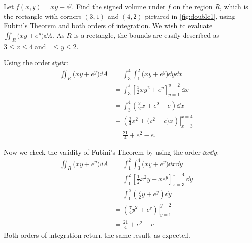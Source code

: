 \begin{example}\label{ex_double1}%
Let $f(x,y) = xy+e^y$. Find the signed volume under $f$ on the region $R$, which is the rectangle with corners $(3,1)$ and $(4,2)$ pictured in \autoref{fig:double1}, using Fubini's Theorem and both orders of integration.
\solution
We wish to evaluate $\iint_R \bigl(xy+e^y\bigr)\dd A$. As $R$ is a rectangle, the bounds are easily described as $3\leq x\leq 4$ and $1\leq y\leq 2$.\bigskip


Using the order $\dd y\dd x$:
\begin{align*}
\iint_R\bigl(xy+e^y\bigr) \dd A
	&= \int_3^4\int_1^2\bigl(xy+e^y\bigr)\dd y \dd x \\
	&= \int_3^4 \left[\frac12xy^2+e^y\right]_{y=1}^{y=2}\ \dd x \\
	&= \int_3^4\left(\frac 32x + e^2-e\right)\dd x \\
	&= \left.\left(\frac 34x^2 + \bigl(e^2-e\bigr)x\right)\right|_{x=3}^{x=4} \\
	&= \frac {21}4+ e^2-e%
	.
\end{align*}

Now we check the validity of Fubini's Theorem by using the order $\dd x\dd y$:
\allowdisplaybreaks
\begin{align*}
\iint_R\bigl(xy+e^y\bigr) \dd A &= \int_1^2\int_3^4\bigl(xy+e^y\bigr)\dd x \dd y \\
		&= \int_1^2\left[\frac12x^2y+xe^y\right]_{x=3}^{x=4}\ \dd y\\
		&= \int_1^2\left(\frac72y+e^y\right)\dd y\\
		&= \left.\left(\frac74y^2+e^y\right)\right|_{y=1}^{y=2}\\
		&=\frac{21}4+e^2-e%
		.
\end{align*}
Both orders of integration return the same result, as expected.
\end{example}

